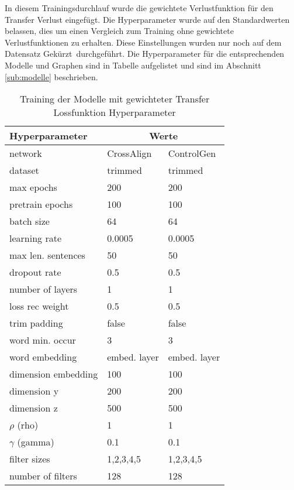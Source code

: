 In diesem Trainingsdurchlauf wurde die gewichtete Verlustfunktion für den Transfer Verlust eingefügt. Die
Hyperparameter wurde auf den Standardwerten belassen, dies um einen Vergleich zum Training ohne gewichtete
Verlustfunktionen zu erhalten. Diese Einstellungen wurden nur noch auf dem Datensatz \flqq Gekürzt\frqq \ durchgeführt.
Die Hyperparameter für die entsprechenden Modelle und Graphen sind in Tabelle
 aufgelistet und sind im Abschnitt \ref{sub:modelle} beschrieben.
\begin{table}[ht]
	\centering
	\begin{tabular}{|l|l|l|}
    \hline
    \textbf{Hyperparameter} &
    \multicolumn{2}{c|}{\textbf{Werte}} \\
    \hline
    network & CrossAlign & ControlGen \\
    \hline
    dataset & trimmed & trimmed \\
    \hline
    max epochs & 200 & 200 \\
    \hline
    pretrain epochs & 100 & 100 \\
    \hline
    batch size & 64 & 64 \\
    \hline
    learning rate & 0.0005 & 0.0005 \\
    \hline
    max len. sentences & 50 & 50 \\
    \hline
    dropout rate & 0.5 & 0.5 \\
    \hline
    number of layers & 1 & 1 \\
    \hline
    loss rec weight & 0.5 & 0.5 \\
    \hline
    trim padding & false & false \\
    \hline
    word min. occur & 3 & 3 \\
    \hline
    word embedding & embed. layer & embed. layer \\
    \hline
    dimension embedding & 100 & 100 \\
    \hline
    dimension y & 200 & 200 \\
    \hline
    dimension z & 500 & 500 \\
    \hline
    $\rho$ (rho) & 1 & 1 \\
    \hline
    $\gamma$ (gamma) & 0.1 & 0.1 \\
    \hline
    filter sizes & 1,2,3,4,5 & 1,2,3,4,5 \\
    \hline
    number of filters & 128 & 128 \\
    \hline
    \end{tabular}
	\caption{Training der Modelle mit gewichteter Transfer Lossfunktion Hyperparameter}
	\label{tab:training_weighted_loss_hyperparameter}
\end{table}

